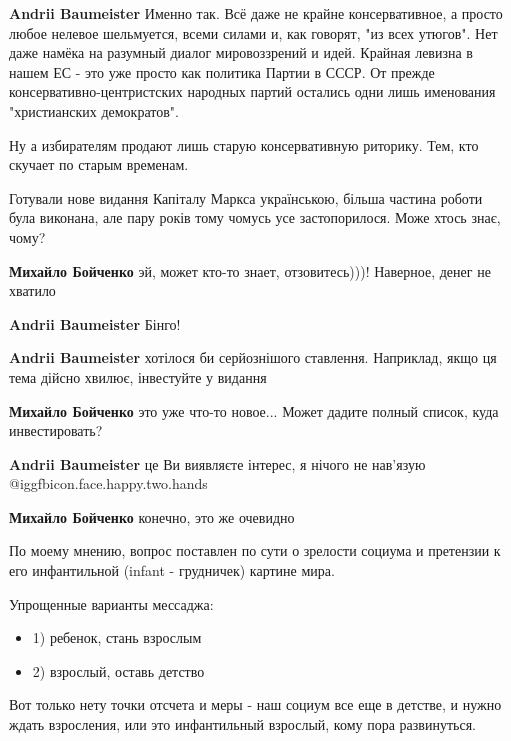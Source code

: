 \begin{itemize}
\begin{itemize}
\textbf{Andrii Baumeister} Именно так. Всё даже не крайне консервативное, а просто любое нелевое шельмуется, всеми силами и, как говорят, "из всех утюгов". Нет даже намёка на разумный диалог мировоззрений и идей. Крайная левизна в нашем ЕС - это уже просто как политика Партии в СССР. От прежде консервативно-центристских народных партий остались одни лишь именования "христианских демократов".

Ну а избирателям продают лишь старую консервативную риторику. Тем, кто скучает по старым временам.
\end{itemize} %


Готували нове видання Капіталу Маркса українською, більша частина роботи була
виконана, але пару років тому чомусь усе застопорилося. Може хтось знає, чому?

\begin{itemize} %
\textbf{Михайло Бойченко} эй, может кто-то знает, отзовитесь)))! Наверное, денег не хватило

\textbf{Andrii Baumeister} Бінго!

\textbf{Andrii Baumeister} хотілося би серйознішого ставлення. Наприклад, якщо ця тема дійсно хвилює, інвестуйте у видання


\textbf{Михайло Бойченко} это уже что-то новое... Может дадите полный список, куда инвестировать?

\textbf{Andrii Baumeister} це Ви виявляєте інтерес, я нічого не нав'язую  @igg{fbicon.face.happy.two.hands} 

\textbf{Михайло Бойченко} конечно, это же очевидно
\end{itemize} %


По моему мнению, вопрос поставлен по сути о зрелости социума и претензии к его
инфантильной (infant - грудничек) картине мира.

Упрощенные варианты мессаджа:

\begin{itemize}
  \item 1) ребенок, стань взрослым 
  \item 2) взрослый, оставь детство
\end{itemize}

Вот только нету точки отсчета и меры - наш социум все еще в детстве, и нужно
ждать взросления, или это инфантильный взрослый, кому пора развинуться.


\end{itemize}
